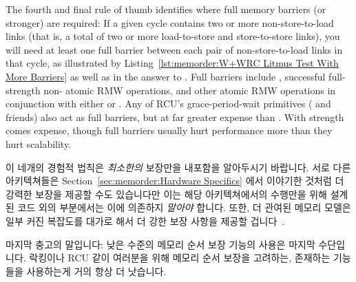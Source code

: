 The fourth and final rule of thumb identifies where full memory barriers
(or stronger) are required:
If a given cycle contains two or more non-store-to-load links (that is,
a total of two or more load-to-store and store-to-store links), you will
need at least one full barrier between each pair of non-store-to-load
links in that cycle, as illustrated by
Listing~\ref{lst:memorder:W+WRC Litmus Test With More Barriers}
as well as in the answer to
\QuickQuizARef{\MemorderQQLitmusTestR}.
Full barriers include , successful full-strength non-
atomic RMW operations, and other atomic RMW operations in conjunction with
either  or .
Any of RCU's grace-period-wait primitives ( and
friends) also act as full barriers, but at far greater expense than
.
With strength comes expense, though full barriers
usually hurt performance more than they hurt scalability.
\fi

이 네개의 경험적 법칙은 \emph{최소한의} 보장만을 내포함을 알아두시기 바랍니다.
서로 다른 아키텍쳐들은
Section~\ref{sec:memorder:Hardware Specifics}
에서 이야기한 것처럼 더 강력한 보장을 제공할 수도 있습니다만 이는 해당
아키텍쳐에서의 수행만을 위해 설계된 코드 외의 부분에서는 이에 의존하지
\emph{말아야} 합니다.
또한, 더 관여된 메모리 모델은 일부 커진 복잡도를 대가로 해서 더 강한 보장
사항을 제공할 겁니다~\cite{Alglave:2018:FSC:3173162.3177156}.

마지막 충고의 말입니다: 낮은 수준의 메모리 순서 보장 기능의 사용은 마지막
수단입니다.
락킹이나 RCU 같이 여러분을 위해 메모리 순서 보장을 고려하는, 존재하는 기능들을
사용하는게 거의 항상 더 낫습니다.

